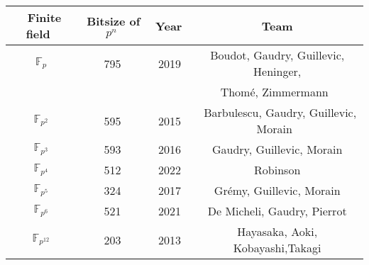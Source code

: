 \documentclass[preview]{standalone}
\begin{document}
\begin{center}
\begin{tabular}{|c|c|c|c|}
   \hline
     $ \,$ Finite field $ \,$ &$ \,$Bitsize of $p^n \,$ &$ \,$ Year$ \,$& $ \,$ Team $ \,$\\
     \hline
     $\mathbb{F}_p$ & 795 & 2019 & Boudot, Gaudry, Guillevic, Heninger, \\
     &&&Thom\'{e}, Zimmermann~\cite{C:BGGHTZ20}\\ 
     $\mathbb{F}_{p^2}$ &  595 & 2015 & $ \,$ Barbulescu, Gaudry, Guillevic, Morain $\,$ \\ 
     $\mathbb{F}_{p^3}$ & 593 & 2016 & Gaudry, Guillevic, Morain \\ 
     $\mathbb{F}_{p^4}$ & 512& 2022 & Robinson \\ 
      $\mathbb{F}_{p^5}$ & 324& 2017 & Gr\'{e}my, Guillevic, Morain \\ 
      $\mathbb{F}_{p^6}$ & 521& 2021 & De Micheli, Gaudry, Pierrot\\
      $\mathbb{F}_{p^{12}}$ & 203& 2013 &Hayasaka, Aoki, Kobayashi,Takagi \\
     \hline
   \end{tabular}
\end{center}
\end{document}
